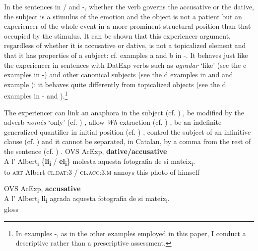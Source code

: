 \documentclass[output=paper,colorlinks,citecolor=brown,nonflat,modfonts]{langsci/langscibook}
\begin{document}
In the sentences in / and -, whether the verb governs the accusative or the dative, the subject is a stimulus of the emotion and the object is not a patient but an experiencer of the whole event in a more prominent structural position than that occupied by the stimulus. It can be shown that this experiencer argument, regardless of whether it is accusative or dative, is not a topicalized element and that it has properties of a subject: cf. examples {a} and {b} in -. It behaves just like the experiencer in sentences with DatExp verbs such as \textit{agradar} ‘like’ (see the {c} examples in -) and other canonical subjects (see the {d} examples in  and  and example ): it behaves quite differently from topicalized objects (see the {d} examples in - and ).\footnote{In examples -, as in the other examples employed in this paper, I conduct a descriptive rather than a prescriptive assessment.}

The experiencer can link an anaphora in the subject (cf. \citealt{Demonte1995, EgurenFernándezSoriano2004}) , be modified by the adverb \textit{només} ‘only’ (cf. \citealt{Cuervo1999}) , allow \textit{Wh-}extraction (cf. \citealt{BellettiRizzi1988}) , be an indefinite generalized quantifier in initial position (cf. \citealt{BellettiRizzi1988, Masullo1992quirky, Cuervo1999}) , control the subject of an infinitive clause (cf. \citealt{Campos1999, Alsina2008})  and it cannot be separated, in Catalan, by a comma from the rest of the sentence (cf. \citealt{Ginebra2003, Ginebra2005}) .
\textbf{}
\ea%
 \label{ex:royo:8}
 \ea OVS AcExp, \textbf{dative/accusative} \label{ex:royo:8a}\\
 \gll A l’ Albert\textsubscript{i} \{\textbf{li\textsubscript{i}} / \textbf{el\textsubscript{i}}\} molesta aquesta fotografia de si mateix\textsubscript{i}.\\
  to \textsc{art} Albert {\textsc{cl.dat:3}} / {\textsc{cl.acc:3.m}} annoys this photo of himself\\
\glt {}
 
  
 \ex OVS AcExp, \textbf{accusative}\label{ex:royo:8c}\\
 \gll A l’ Albert\textsubscript{i} \textbf{li\textsubscript{i}} agrada aquesta fotografia de si mateix\textsubscript{i}.\\
gloss\\
\glt {}
\end{document}
